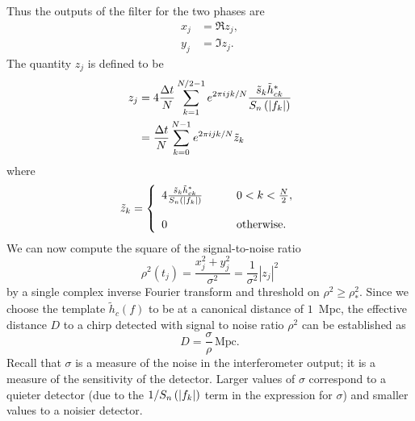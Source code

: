 Thus the outputs of the filter for the two phases are
\begin{align}
x_j &= \Re z_j, \\
y_j &= \Im z_j.
\end{align}
The quantity $z_j$ is defined to be
\begin{equation}
\begin{split}
\label{eq:zdef}
z_j &= 4 \frac{\Delta t}{N}\sum_{k=1}^{N/2-1} e^{2\pi ijk/N} 
\frac{\tilde{s}_k \tilde{h}_{ck}^\ast}{S_n\left(\left|f_{k}\right|\right)}  \\
&= \frac{\Delta t}{N}\sum_{k=0}^{N-1} e^{2\pi ijk/N} \tilde{z}_k
\end{split}
\end{equation}
where
\begin{equation}
\label{eq:ztildedef}
\tilde{z}_k = \left\{
\begin{array}{ll}
4 \frac{\tilde{s}_k \tilde{h}_{ck}^\ast}{S_n\left(\left|f_{k}\right|\right)} 
  \quad\quad & 0 < k < \frac{N}{2},\\
\\
0 & \mathrm{otherwise}.
\end{array}
\right.
\end{equation}
We can now compute the square of the signal-to-noise ratio
\begin{equation}
\rho^2(t_j) = \frac{x_j^2 + y_j^2}{\sigma^2} = \frac{1}{\sigma^2}|z_j|^2
\end{equation}
by a single complex inverse Fourier transform and threshold on $\rho^2 \ge
\rho^2_\ast$.  Since we choose the template $\tilde{h}_c(f)$ to be at a
canonical distance of $1$~Mpc, the effective distance $D$ to a chirp
detected with signal to noise ratio $\rho^2$ can be established as
\begin{equation}
D = \frac{\sigma}{\rho} \,\mathrm{Mpc}.
\label{eq:effdistdef}
\end{equation}
Recall that $\sigma$ is a measure of the noise in the interferometer output;
it is a measure of the sensitivity of the detector.  Larger values of $\sigma$
correspond to a quieter detector (due to the $1/S_n\left(\left|f_{k}\right|\right)$ term in the expression
for $\sigma$) and smaller values to a noisier detector. 

